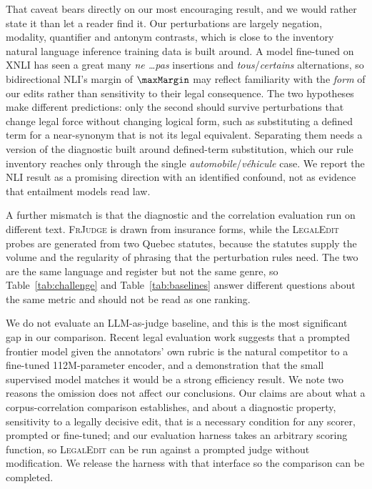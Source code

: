 \documentclass[11pt]{article}
\begin{document}
That caveat bears directly on our most encouraging result, and we would rather
state it than let a reader find it. Our perturbations are largely negation,
modality, quantifier and antonym contrasts, which is close to the inventory
natural language inference training data is built around. A model fine-tuned on
XNLI has seen a great many \emph{ne \dots pas} insertions and
\emph{tous}/\emph{certains} alternations, so bidirectional NLI's margin of
$\maxMargin$ may reflect familiarity with the \emph{form} of our edits rather
than sensitivity to their legal consequence. The two hypotheses make different
predictions: only the second should survive perturbations that change legal
force without changing logical form, such as substituting a defined term for a
near-synonym that is not its legal equivalent. Separating them needs a version
of the diagnostic built around defined-term substitution, which our rule
inventory reaches only through the single \emph{automobile}/\emph{v\'ehicule}
case. We report the NLI result as a promising direction with an identified
confound, not as evidence that entailment models read law.

A further mismatch is that the diagnostic and the correlation evaluation run on
different text. \textsc{FrJudge} is drawn from insurance forms, while the
\textsc{LegalEdit} probes are generated from two Quebec statutes, because the
statutes supply the volume and the regularity of phrasing that the perturbation
rules need. The two are the same language and register but not the same genre,
so Table~\ref{tab:challenge} and Table~\ref{tab:baselines} answer different
questions about the same metric and should not be read as one ranking.

We do not evaluate an LLM-as-judge baseline, and this is the most significant
gap in our comparison. Recent legal evaluation work \citep{zhou2024lemaj}
suggests that a prompted frontier model given the annotators' own rubric is the
natural competitor to a fine-tuned 112M-parameter encoder, and a demonstration
that the small supervised model matches it would be a strong efficiency result.
We note two reasons the omission does not affect our conclusions. Our claims are
about what a corpus-correlation comparison establishes, and about a diagnostic
property, sensitivity to a legally decisive edit, that is a necessary condition
for any scorer, prompted or fine-tuned; and our evaluation harness takes an
arbitrary scoring function, so \textsc{LegalEdit} can be run against a prompted
judge without modification. We release the harness with that interface so the
comparison can be completed.
\end{document}
